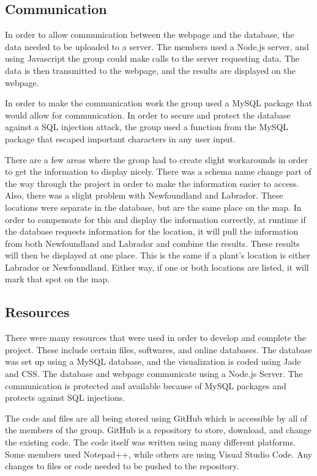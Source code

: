 \documentclass{Group6_Phase2}
\begin{document}
\subsection{Communication}
In order to allow communication between the webpage and the database, the data needed to be uploaded to a server. The members used a Node.js server, and using Javascript  the group could make calls to the server requesting data. The data is then transmitted to the webpage, and the results are displayed on the webpage. 

In order to make the communication work the group used a MySQL package that would allow for communication. In order to secure and protect the database against a SQL injection attack, the group used a function from the MySQL package that escaped important characters in any user input.

There are a few areas where the group had to create slight workarounds in order to get the information to display nicely. There was a schema name change part of the way through the project in order to make the information easier to access. Also, there was a slight problem with Newfoundland and Labrador. These locations were separate in the database, but are the same place on the map. In order to compensate for this and display the information correctly, at runtime if the database requests information for the location, it will pull the information from both Newfoundland and Labrador and combine the results. These results will then be displayed at one place. This is the same if a plant's location is either Labrador or Newfoundland. Either way, if one or both locations are listed, it will mark that spot on the map. 

\subsection{Resources}
There were many resources that were used in order to develop and complete the project. These include certain files, softwares, and online databases. The database was set up using a MySQL database, and the visualization is coded using Jade and CSS. The database and webpage communicate using a Node.js Server. The communication is protected and available because of MySQL packages and protects against SQL injections.

The code and files are all being stored using GitHub which is accessible by all of the members of the group. GitHub is a repository to store, download, and change the existing code. The code itself was written using many different platforms. Some members used Notepad++, while others are using Visual Studio Code. Any changes to files or code needed to be pushed to the repository.
\end{document}

